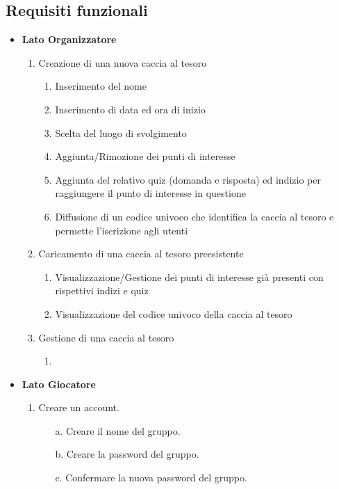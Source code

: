 \documentclass[12pt, italian]{article}
\begin{document}
\subsection{Requisiti funzionali}
\begin{itemize}
	\item \textbf{Lato Organizzatore} 
	\begin{enumerate}
		\item Creazione di una nuova caccia al tesoro
			\begin{enumerate}[label=(\alph*)]
				\item Inserimento del nome
				\item Inserimento di data ed ora di inizio
				\item Scelta del luogo di svolgimento
				\item Aggiunta/Rimozione dei punti di interesse 
				\item Aggiunta del relativo quiz (domanda e risposta) ed indizio per raggiungere il punto di interesse in questione
				\item Diffusione di un codice univoco che identifica la caccia al tesoro e permette l'iscrizione agli utenti
			\end{enumerate}
		\item Caricamento di una caccia al tesoro preesistente
		\begin{enumerate}[label=(\alph*)]
			\item Visualizzazione/Gestione dei punti di interesse già presenti con rispettivi indizi e quiz
			\item Visualizzazione del codice univoco della caccia al tesoro
		\end{enumerate}
	\item Gestione di una caccia al tesoro
		\begin{enumerate}[label=(\alph*)]
			\item 
		\end{enumerate}
	\end{enumerate}
	\item \textbf{Lato Giocatore}
		\begin{enumerate}
			\item Creare un account.
			\begin{enumerate}
				\item [a.] Creare il nome del gruppo.
				\item [b.] Creare la password del gruppo.
				\item [c.] Confermare la nuova password del gruppo.
			\end{enumerate}

\end{enumerate}
\end{itemize}
\end{document}
